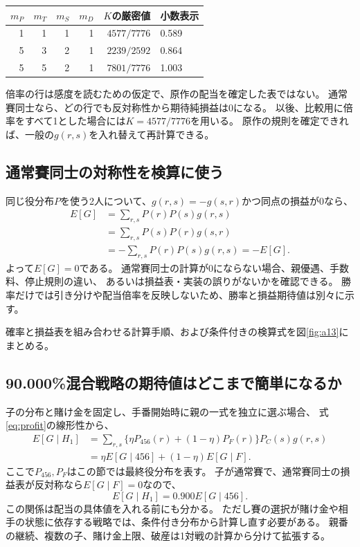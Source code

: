 \documentclass[11pt,a4paper]{article}
\numberwithin{equation}{section}
\begin{document}
\begin{center}
\begin{tabular}{rrrrrl}
\toprule
$m_P$&$m_T$&$m_S$&$m_D$&$K$の厳密値&小数表示\\
\midrule
1&1&1&1&$4577/7776$&0.589\\
5&3&2&1&$2239/2592$&0.864\\
5&5&2&1&$7801/7776$&1.003\\
\bottomrule
\end{tabular}
\end{center}
倍率の行は感度を読むための仮定で、原作の配当を確定した表ではない。
通常賽同士なら、どの行でも反対称性から期待純損益は0になる。
以後、比較用に倍率をすべて1とした場合には$K=4577/7776$を用いる。
原作の規則を確定できれば、一般の$g(r,s)$を入れ替えて再計算できる。

\subsection{通常賽同士の対称性を検算に使う}
同じ役分布$P$を使う2人について、$g(r,s)=-g(s,r)$かつ同点の損益が0なら、
\begin{align}
E[G]&=\sum_{r,s}P(r)P(s)g(r,s)\\
&=\sum_{r,s}P(s)P(r)g(s,r)\\
&=-\sum_{r,s}P(r)P(s)g(r,s)=-E[G].
\end{align}
よって$E[G]=0$である。
通常賽同士の計算が0にならない場合、親優遇、手数料、停止規則の違い、
あるいは損益表・実装の誤りがないかを確認できる。
勝率だけでは引き分けや配当倍率を反映しないため、勝率と損益期待値は別々に示す。

確率と損益表を組み合わせる計算手順、および条件付きの検算式を図\ref{fig:a13}にまとめる。


\subsection{90.000\%混合戦略の期待値はどこまで簡単になるか}
子の分布と賭け金を固定し、手番開始時に親の一式を独立に選ぶ場合、
式\eqref{eq:profit}の線形性から、
\begin{align}
E[G\mid H_1]
&=\sum_{r,s}
\{\eta P_{456}(r)+(1-\eta)P_F(r)\}P_C(s)g(r,s)\\
&=\eta E[G\mid456]+(1-\eta)E[G\mid F].
\end{align}
ここで$P_{456},P_F$はこの節では最終役分布を表す。
子が通常賽で、通常賽同士の損益表が反対称なら$E[G\mid F]=0$なので、
\[
E[G\mid H_1]=0.900E[G\mid456].
\]
この関係は配当の具体値を入れる前にも分かる。
ただし賽の選択が賭け金や相手の状態に依存する戦略では、条件付き分布から計算し直す必要がある。
親番の継続、複数の子、賭け金上限、破産は1対戦の計算から分けて拡張する。
\end{document}
